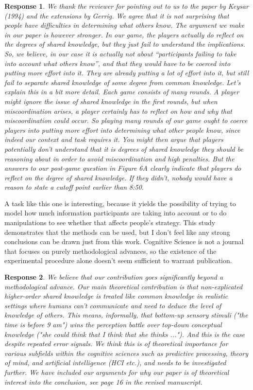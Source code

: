 \documentclass[a4paper]{article}
\newtheorem{response}{Response}
\begin{document}
\begin{response}
We thank the reviewer for pointing out to us to the paper by Keysar (1994) and the extensions by Gerrig. We agree that it is not surprising that people have difficulties in determining what others know. The argument we make in our paper is however stronger. In our game, the players actually \emph{do} reflect on the degrees of shared knowledge, but they just fail to understand the implications. So, we believe, in our case it is actually not about ``participants failing to take into account what others know'', and that they would have to be coerced into putting more effort into it. They are already putting a lot of effort into it, but still fail to separate shared knowledge of some degree from common knowledge. Let's explain this in a bit more detail. Each game consists of many rounds. A player might ignore the issue of shared knowledge in the first rounds, but when miscoordination arises, a player certainly has to reflect on how and why that miscoordination could occur. So playing many rounds of our game ought to coerce players into putting more effort into determining what other people know, since indeed our context and task requires it. You might then argue that players potentially don't understand that it is degrees of shared knowledge they should be reasoning about in order to avoid miscoordination and high penalties. But the answers to our post-game question in Figure 6A clearly indicate that players \emph{do} reflect on the degree of shared knowledge. If they didn't, nobody would have a reason to state a cutoff point earlier than 8:50.
\end{response}

A task like this one is interesting, because it yields the possibility of trying to model how much information participants are taking into account or to do manipulations to see whether that affects people's strategy. This study demonstrates that the methods can be used, but I don't feel like any strong conclusions can be drawn just from this work. Cognitive Science is not a journal that focuses on purely methodological advances, so the existence of the experimental procedure alone doesn't seem sufficient to warrant publication.

\begin{response}
We believe that our contribution goes significantly beyond a methodological advance. Our main theoretical contribution is that non-explicated higher-order shared knowledge is treated like common knowledge in realistic settings where humans can't communicate and need to \emph{deduce} the level of knowledge of others. This means, informally, that bottom-up sensory stimuli ("the time is before 9 am") \emph{wins the perception battle} over top-down conceptual knowledge ("she could think that I think that she thinks ..."). And this is the case despite repeated error signals. We think this is of theoretical importance for various subfields within the cognitive sciences such as predictive processing, theory of mind, and artificial intelligence (HCI etc.), and needs to be investigated further. We have included our arguments for why our paper is of theoretical interest into the conclusion, see page 16 in the revised manuscript.
\end{response}
\end{document}
